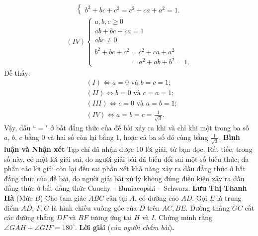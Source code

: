 \begin{multicols}{2}
\begin{align*}
\begin{cases}
			{b^2} + bc + {c^2} = {c^2} + ca + {a^2} = 1.
		\end{cases}
	\end{align*}
	\begin{align*}
		(IV)\begin{cases}
				a,b,c \ge 0\\[-0.4ex]
				ab + bc + ca = 1\\[-0.4ex]
				abc \ne 0\\[-0.4ex]
				{b^2} + bc + {c^2} = {c^2} + ca + {a^2} \\[-0.4ex]
				\quad\quad\quad\quad\quad= {a^2} + ab + {b^2} = 1.
		\end{cases}
	\end{align*}
	Dễ thấy:
	\begin{align*}
		&(I) \Leftrightarrow a = 0 \text{ và } b = c = 1;\\[-0.4ex]
		&(II) \Leftrightarrow b = 0 \text{ và } c = a = 1;\\[-0.4ex]
		&(III) \Leftrightarrow c = 0 \text{ và } a = b = 1;\\[-0.4ex]
		&(IV) \Leftrightarrow a=b=c= \frac{1}{\sqrt{3}}.
	\end{align*}
	Vậy, dấu ``$=$" ở bất đẳng thức của đề bài xảy ra khi và chỉ khi một trong ba số $a$, $b$, $c$ bằng $0$ và hai số còn lại bằng $1$, hoặc cả ba số đó cùng bằng  $\frac{1}{\sqrt{3}}$.
	\vskip 0.05cm
	\textbf{\color{thachthuctoanhoc}Bình luận và Nhận xét}
	\vskip 0.05cm
	Tạp chí đã nhận được $10$ lời giải, từ bạn đọc. Rất tiếc, trong số này, có một lời giải sai, do người giải bài đã biến đổi sai một số biểu thức; đa phần các lời giải còn lại đều sai phần xét khả năng xảy ra dấu đẳng thức ở bất đẳng thức của đề bài, do người giải bài xử lý không đúng điều kiện xảy ra dấu đẳng thức ở bất đẳng thức Cauchy -- Buniacopski -- Schwarz.
	\vskip 0.05cm
	\hfill	\textbf{\color{thachthuctoanhoc}Lưu Thị Thanh Hà}
	\vskip 0.05cm
	\columnbreak
	{}
	(Mức $B$) Cho tam giác $ABC$ cân tại $A$, có đường cao $AD$. Gọi $E$ là trung điểm $AD$; $F,G$ là hình chiếu vuông góc của $D$ trên $AC,BE$. Đường thẳng $GC$ cắt các đường thẳng $DF$ và $BF$ tương ứng tại $H$ và $I$. Chứng minh rằng $\angle{GAH}+\angle{GIF}=180^\circ$.  
	\vskip 0.05cm
	\textbf{\color{thachthuctoanhoc}Lời giải} (\textit{của người chấm bài})\textbf{\color{thachthuctoanhoc}.}
	\begin{figure}[H]
		\vspace*{-10pt}
		\centering
		\captionsetup{labelformat= empty, justification=centering}

\end{figure}
\end{multicols}
